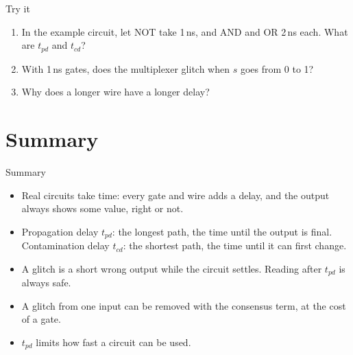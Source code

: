 \documentclass[10pt]{wosm-slides}
\begin{document}
\begin{frame}{Try it}
  \begin{enumerate}
    \item In the example circuit, let NOT take 1\,ns, and AND and OR 2\,ns each.
      What are $t_{pd}$ and $t_{cd}$?\par
    \item With 1\,ns gates, does the multiplexer glitch when $s$ goes from 0 to
      1?\par
    \item Why does a longer wire have a longer delay?\par
  \end{enumerate}
\end{frame}

\section{Summary}

\begin{frame}{Summary}
  \begin{itemize}
    \item Real circuits take time: every gate and wire adds a delay, and the output
      always shows some value, right or not.
    \item Propagation delay $t_{pd}$: the longest path, the time until the output is
      final. Contamination delay $t_{cd}$: the shortest path, the time until it can
      first change.
    \item A glitch is a short wrong output while the circuit settles. Reading after
      $t_{pd}$ is always safe.
    \item A glitch from one input can be removed with the consensus term, at the cost
      of a gate.
    \item $t_{pd}$ limits how fast a circuit can be used.
  \end{itemize}
\end{frame}
\end{document}
